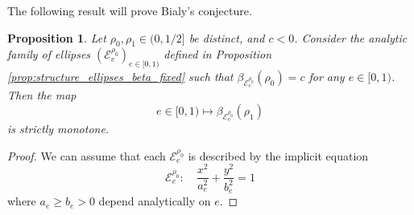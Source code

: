 \documentclass[a4paper]{article}
\newtheorem{proposition}{Proposition}
\theoremstyle{definition}
\begin{document}
The following result will prove Bialy's conjecture.

\begin{proposition}
    Let $\rho_0,\rho_1\in(0,1/2]$ be distinct, and $c<0$. Consider the analytic family of ellipses $(\mathscr E_e^{\rho_0})_{e\in[0,1)}$ defined in Proposition \ref{prop:structure_ellipses_beta_fixed} such that $\beta_{\mathscr E_e^{\rho_0}}(\rho_0)=c$ for any $e\in[0,1)$. Then the map
    \[
    e\in[0,1)\mapsto\beta_{\mathscr E_e^{\rho_0}}(\rho_1)
    \]
    is strictly monotone.
\end{proposition}

\begin{proof}
    We can assume that each $\mathscr E_e^{\rho_0}$ is described by the implicit equation
    \begin{equation}
\label{eq:ellipse_implicit_2}
\mathscr E_{e}^{\rho_0}:\quad 
\frac{x^2}{a_{e}^2}+\frac{y^2}{b_{e}^2}=1
\end{equation}
where $a_e\geq b_e>0$ depend analytically on $e$. 


\end{proof}
\end{document}
